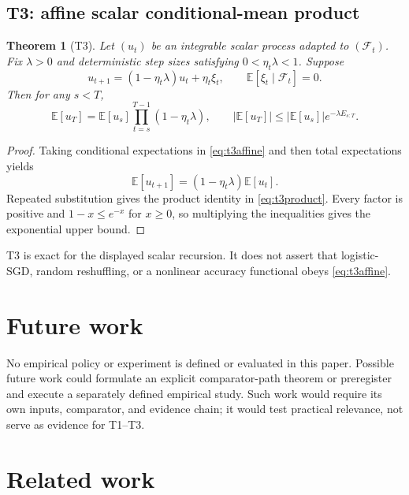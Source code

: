 \documentclass{article}
\newtheorem{theorem}{Theorem}
\begin{document}
\subsection{T3: affine scalar conditional-mean product}
\label{sec:t3}

\begin{theorem}[T3]
\label{thm:t3}
Let $(u_t)$ be an integrable scalar process adapted to
$(\mathcal F_t)$. Fix $\lambda>0$ and deterministic step sizes satisfying
$0<\eta_t\lambda<1$. Suppose
\begin{equation}
 u_{t+1}=(1-\eta_t\lambda)u_t+\eta_t\xi_t,\qquad
 \mathbb E[\xi_t\mid\mathcal F_t]=0.
\label{eq:t3affine}
\end{equation}
Then for any $s<T$,
\begin{equation}
 \mathbb E[u_T]=\mathbb E[u_s]\prod_{t=s}^{T-1}
 (1-\eta_t\lambda),\qquad
 |\mathbb E[u_T]|
 \leq|\mathbb E[u_s]|e^{-\lambda E_{s:T}}.
\label{eq:t3product}
\end{equation}
\end{theorem}

\begin{proof}
Taking conditional expectations in \eqref{eq:t3affine} and then total
expectations yields
\[
 \mathbb E[u_{t+1}]=(1-\eta_t\lambda)\mathbb E[u_t].
\]
Repeated substitution gives the product identity in \eqref{eq:t3product}.
Every factor is positive and $1-x\leq e^{-x}$ for $x\geq0$, so multiplying
the inequalities gives the exponential upper bound.
\end{proof}

T3 is exact for the displayed scalar recursion. It does not assert that
logistic-SGD, random reshuffling, or a nonlinear accuracy functional obeys
\eqref{eq:t3affine}.

\section{Future work}
\label{sec:empirical-status}

No empirical policy or experiment is defined or evaluated in this paper.
Possible future work could formulate an explicit comparator-path theorem or
preregister and execute a separately defined empirical study. Such work would
require its own inputs, comparator, and evidence chain; it would test practical
relevance, not serve as evidence for T1--T3.

\section{Related work}
\label{sec:related}
\end{document}
